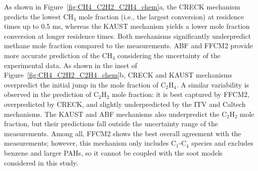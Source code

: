 As shown in Figure~\ref{fig:CH4_C2H2_C2H4_chem}a, the CRECK mechanism predicts the lowest $\mathrm{CH_4}$ mole fraction (i.e., the largest conversion) at residence times up to 0.5 ms, whereas the KAUST mechanism yields a lower mole fraction conversion at longer residence times. Both mechanisms significantly underpredict methane mole fraction compared to the measurements. ABF and FFCM2 provide more accurate prediction of the $\mathrm{CH_4}$ considering the uncertainty of the experimental data. As shown in the inset of Figure~\ref{fig:CH4_C2H2_C2H4_chem}b, CRECK and KAUST mechanisms overpredict the initial jump in the mole fraction of  $\mathrm{C_2H_4}$. A similar variability is observed in the prediction of $\mathrm{C_2H_2}$ mole fraction: it is best captured by FFCM2, overpredicted by CRECK, and slightly underpredicted by the ITV and Caltech mechanisms. The KAUST and ABF mechanisms also underpredict the $\mathrm{C_2H_2}$ mole fraction, but their predictions fall outside the uncertainty range of the measurements. Among all, FFCM2 shows the best overall agreement with the measurements; however, this mechanism only includes $\mathrm{C_1}$-$\mathrm{C_4}$ species and excludes benzene and larger PAHs, so it cannot be coupled with the soot models considered in this study.
